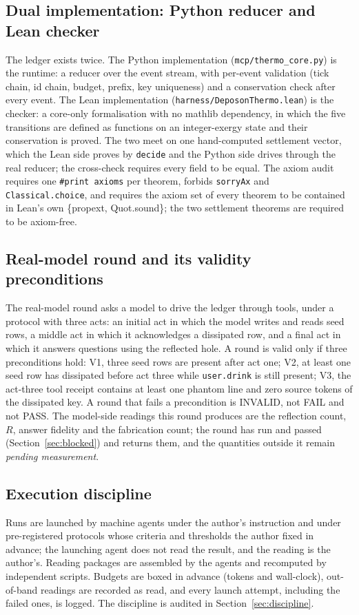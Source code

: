 \documentclass[11pt,a4paper]{article}
\begin{document}
\subsection{Dual implementation: Python reducer and Lean checker}
\label{sec:dual}
The ledger exists twice. The Python implementation (\texttt{mcp/thermo\_core.py}) is the runtime: a reducer over the event stream, with per-event validation (tick chain, id chain, budget, prefix, key uniqueness) and a conservation check after every event. The Lean implementation (\texttt{harness/DeposonThermo.lean}) is the checker: a core-only formalisation with no mathlib dependency, in which the five transitions are defined as functions on an integer-exergy state and their conservation is proved. The two meet on one hand-computed settlement vector, which the Lean side proves by \texttt{decide} and the Python side drives through the real reducer; the cross-check requires every field to be equal. The axiom audit requires one \texttt{\#print axioms} per theorem, forbids \texttt{sorryAx} and \texttt{Classical.choice}, and requires the axiom set of every theorem to be contained in Lean's own \{propext, Quot.sound\}; the two settlement theorems are required to be axiom-free.

\subsection{Real-model round and its validity preconditions}
\label{sec:live-method}
The real-model round asks a model to drive the ledger through tools, under a protocol with three acts: an initial act in which the model writes and reads seed rows, a middle act in which it acknowledges a dissipated row, and a final act in which it answers questions using the reflected hole. A round is valid only if three preconditions hold: V1, three seed rows are present after act one; V2, at least one seed row has dissipated before act three while \texttt{user.drink} is still present; V3, the act-three tool receipt contains at least one phantom line and zero source tokens of the dissipated key. A round that fails a precondition is INVALID, not FAIL and not PASS. The model-side readings this round produces are the reflection count, $R$, answer fidelity and the fabrication count; the round has run and passed (Section~\ref{sec:blocked}) and returns them, and the quantities outside it remain \emph{pending measurement}.

\subsection{Execution discipline}
\label{sec:execution}
Runs are launched by machine agents under the author's instruction and under pre-registered protocols whose criteria and thresholds the author fixed in advance; the launching agent does not read the result, and the reading is the author's. Reading packages are assembled by the agents and recomputed by independent scripts. Budgets are boxed in advance (tokens and wall-clock), out-of-band readings are recorded as read, and every launch attempt, including the failed ones, is logged. The discipline is audited in Section~\ref{sec:discipline}.
\end{document}
